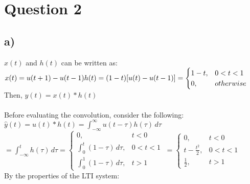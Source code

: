 \documentclass[12pt]{article}
\begin{document}
    \section*{Question 2}
    \subsection*{a)}
	\(x(t)\) and \(h(t)\) can be written as: \\
    \begin{math}
      x(t) = u(t+1)-u(t-1) \\
      h(t) =  (1-t)[u(t)-u(t-1)] = \begin{cases}
      1-t,& 0<t<1 \\
      0,& otherwise
    \end{cases} \end{math}\\
      Then, \begin{math}y(t) = x(t)*h(t) \end{math}\\ \\
      Before evaluating the convolution, consider the following: \\
     \begin{math} \hat{y}(t) = u(t)*h(t) = \int_{-\infty}^{\infty} u(t-\tau)h(\tau) \,d\tau \end{math} \\
     \begin{math}  = \int_{-\infty}^{t} h(\tau) \,d\tau = \begin{cases}
      0,& t < 0\\
      \int_{0}^{t} (1-\tau) \,d\tau,& 0 < t < 1\\
     \int_{0}^{1} (1-\tau) \,d\tau,& t > 1
    \end{cases} \ =   \begin{cases}
      0,& t < 0\\
      t - \frac{t^{2}}{2} ,& 0 < t < 1\\
     \frac{1}{2},& t > 1
    \end{cases}  \end{math} \\
    By the properties of the LTI system: \\ 
\end{document}
